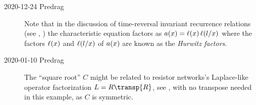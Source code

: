 \begin{description}
    \item[2020-12-24 Predrag]
Note that in the discussion of time-reversal invariant recurrence
relations  (see , \etc)
the characteristic equation factors as $a(x)=\ell(x)\,\ell(l/x)$
where the factors $\ell(x)$ and $\ell(l/x)$ of $a(x)$ are known
as the \emph{Hurwitz factors}.

    \item[2020-01-10 Predrag]
The ``square root'' $C$  might be related to resistor
networks's Laplace-like operator factorization $L = R\transp{R}$, see
, with no transpose needed in this
example, as $C$ is
symmetric.

%
%


\end{description}
